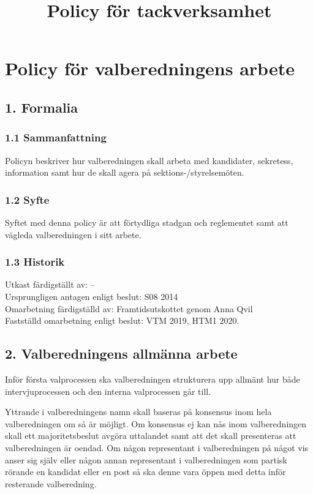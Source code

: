 \documentclass{dsekkallelse}
\title{Policy för tackverksamhet}
\author{}
\begin{document}
\section{Policy för valberedningens arbete}

\subsection{1. Formalia}
\subsubsection{1.1 Sammanfattning}
Policyn beskriver hur valberedningen skall arbeta med kandidater, sekretess, information samt
hur de skall agera på sektions-/styrelsemöten.

\subsubsection{1.2 Syfte}
Syftet med denna policy är att förtydliga stadgan och reglementet samt att vägleda valberedningen i sitt arbete.

\subsubsection{1.3 Historik}
Utkast färdigställt av: – \\
Ursprungligen antagen enligt beslut: S08 2014\\
Omarbetning färdigställd av: Framtidsutskottet genom Anna Qvil\\
Fastställd omarbetning enligt beslut: VTM 2019, HTM1 2020. 

\subsection{2. Valberedningens allmänna arbete}

Inför första valprocessen ska valberedningen strukturera upp allmänt hur både intervjuprocessen och den
interna valprocessen går till.

Yttrande i valberedningens namn skall baseras på konsensus inom hela valberedningen om
så är möjligt. Om konsensus ej kan nås inom valberedningen skall ett majoritetsbeslut avgöra
uttalandet samt att det skall presenteras att valberedningen är oendad.
Om någon representant i valberedningen på något vis anser sig själv eller någon annan representant i valberedningen som partisk rörande en kandidat eller en post så ska denne vara
öppen med detta inför resterande valberedning.
\end{document}
